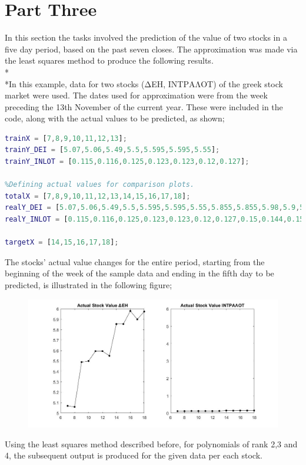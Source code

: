 \documentclass{article}
\begin{document}
\section{Part Three}
In this section the tasks involved the prediction of the value of two stocks in a five day period, based on the past seven closes. The approximation was made via the least squares method to produce the following results.
\\*\\*In this example, data for two stocks (\foreignlanguage{greek}{ΔΕΗ, ΙΝΤΡΑΛΟΤ}) of the greek stock market were used. The dates used for approximation were from the week preceding the 13th November of the current year. These were included in the code, along with the actual values to be predicted, as shown;
\begin{lstlisting}[language=Matlab]
%Defining data for approximation base.
trainX = [7,8,9,10,11,12,13];
trainY_DEI = [5.07,5.06,5.49,5.5,5.595,5.595,5.55];
trainY_INLOT = [0.115,0.116,0.125,0.123,0.123,0.12,0.127];

%Defining actual values for comparison plots.
totalX = [7,8,9,10,11,12,13,14,15,16,17,18];
realY_DEI = [5.07,5.06,5.49,5.5,5.595,5.595,5.55,5.855,5.855,5.98,5.9,5.975];
realY_INLOT = [0.115,0.116,0.125,0.123,0.123,0.12,0.127,0.15,0.144,0.15,0.15,0.153];

targetX = [14,15,16,17,18];
\end{lstlisting}
The stocks' actual value changes for the entire period, starting from the beginning of the week of the sample data and ending in the fifth day to be predicted, is illustrated in the following figure;
\begin{figure}[h]
\centering
\includegraphics[scale=0.5]{images/actual_stock_values.jpg}
\end{figure}
\pagebreak 
\linebreak Using the least squares method described before, for polynomials of rank 2,3 and 4, the subsequent output is produced for the given data per each stock.
\end{document}
